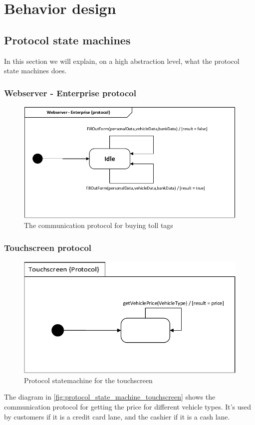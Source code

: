 \section*{Behavior design}
\subsection*{Protocol state machines}
In this section we will explain, on a high abstraction level, what the protocol state machines does.
\subsubsection*{Webserver - Enterprise protocol}
\begin{figure}[H]
\centering
\includegraphics[width=0.7\linewidth]{img/behaviour_state_machines/protocol_state_machines/protocol_state_machine_webserver_to_enterprise}
\caption{The communication protocol for buying toll tags}
\label{fig:protocol_state_machine_webserver_to_enterprise}
\end{figure}

\subsubsection*{Touchscreen protocol}
\begin{figure}[H]
\centering
\includegraphics[width=0.7\linewidth]{img/behaviour_state_machines/protocol_state_machines/protocol_state_machine_touchscreen}
\caption{Protocol statemachine for the touchscreen}
\label{fig:protocol_state_machine_touchscreen}
\end{figure}
The diagram in \autoref{fig:protocol_state_machine_touchscreen} shows the communication protocol for getting the price for different vehicle types. It's used by customers if it is a credit card lane, and the cashier if it is a cash lane.

